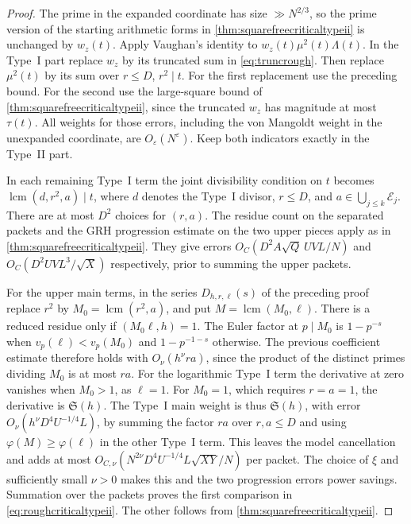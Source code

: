 \documentclass[11pt,a4paper]{article}
\numberwithin{equation}{section}
\newcommand{\SSS}{\mathfrak S}
\begin{document}
\begin{proof}
The prime in the expanded coordinate has size $\gg N^{2/3}$,
so the prime version of the starting arithmetic forms in
\cref{thm:squarefreecriticaltypeii} is unchanged by $w_z(t)$.
Apply Vaughan's identity to $w_z(t)\mu^2(t)\Lambda(t)$.
In the Type~I part replace $w_z$ by its truncated sum
in \cref{eq:truncrough}. Then replace $\mu^2(t)$ by its
sum over $r\le D$, $r^2\mid t$. For the first replacement
use the preceding bound. For the second use the
large-square bound of \cref{thm:squarefreecriticaltypeii},
since the truncated $w_z$ has magnitude at most $\tau(t)$.
All weights for those errors, including the von Mangoldt
weight in the unexpanded coordinate, are
$O_\varepsilon(N^\varepsilon)$. Keep both indicators
exactly in the Type~II part.

In each remaining Type~I term the joint divisibility
condition on $t$ becomes $\operatorname{lcm}(d,r^2,a)\mid t$,
where $d$ denotes the Type~I divisor, $r\le D$, and
$a\in\bigcup_{j\le k}\mathcal E_j$. There are at most $D^2$
choices for $(r,a)$. The residue count on the separated
packets and the GRH progression estimate on the two
upper pieces apply as in \cref{thm:squarefreecriticaltypeii}.
They give errors
$O_C(D^2A\sqrt Q\,UVL/N)$ and $O_C(D^2 UVL^3/\sqrt X)$
respectively, prior to summing the upper packets.

For the upper main terms, in the series $D_{h,r,\ell}(s)$
of the preceding proof replace $r^2$ by
$M_0=\operatorname{lcm}(r^2,a)$, and put
$M=\operatorname{lcm}(M_0,\ell)$.
There is a reduced residue only if $(M_0\ell,h)=1$.
The Euler factor at $p\mid M_0$ is $1-p^{-s}$ when
$v_p(\ell)<v_p(M_0)$ and $1-p^{-1-s}$ otherwise.
The previous coefficient estimate therefore holds with
$O_\nu(h^\nu r a)$, since the product of the distinct
primes dividing $M_0$ is at most $r a$.
For the logarithmic Type~I term the derivative at zero
vanishes when $M_0>1$, as $\ell=1$. For $M_0=1$, which
requires $r=a=1$, the derivative is $\SSS(h)$.
The Type~I main weight is thus $\SSS(h)$, with error
$O_\nu(h^\nu D^4 U^{-1/4}L)$, by summing the factor $r a$
over $r,a\le D$ and using $\varphi(M)\ge\varphi(\ell)$
in the other Type~I term.
This leaves the model cancellation and adds at most
$O_{C,\nu}(N^{2\nu}D^4U^{-1/4}L\sqrt{XY}/N)$ per packet.
The choice of $\xi$ and sufficiently small $\nu>0$ makes
this and the two progression errors power savings.
Summation over the packets proves the first comparison
in \cref{eq:roughcriticaltypeii}. The other follows from
\cref{thm:squarefreecriticaltypeii}.
\end{proof}
\end{document}
